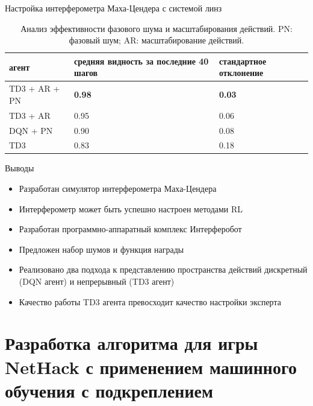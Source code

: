 \begin{frame}[allowframebreaks]{Настройка интерферометра Маха-Цендера с системой линз}
\begin{table} [htbp]
    \centering
    \begin{threeparttable}
        \caption*{Анализ эффективности фазового шума и масштабирования действий. PN: фазовый шум; AR: масштабирование действий.}
        \begin{tabular}{| p{3cm} || p{3cm} || p{3cm} |}
            \hline
            \hline
            агент & средняя видность за последние 40 шагов & стандартное отклонение \\
            \hline
            TD3 + AR + PN & \textbf{0.98} & \textbf{0.03} \\
            TD3 + AR & 0.95 & 0.06\\
            DQN + PN & 0.90 & 0.08\\
            TD3& 0.83 & 0.18\\
            \hline
            \hline
        \end{tabular}
    \end{threeparttable}
\end{table}

\end{frame}


\begin{frame}{Выводы}
\begin{itemize}
    \item Разработан симулятор интерферометра Маха-Цендера
    \item Интерферометр может быть успешно настроен методами RL
    \item Разработан программно-аппаратный комплекс Интерферобот
    \item Предложен набор шумов и функция награды
    \item Реализовано два подхода к представлению пространства действий дискретный (DQN агент) и непрерывный (TD3 агент)
    \item  Качество работы TD3 агента превосходит качество настройки эксперта

\end{itemize}
    



\end{frame}


\section{Разработка алгоритма для игры NetHack с
применением машинного обучения с подкреплением}

